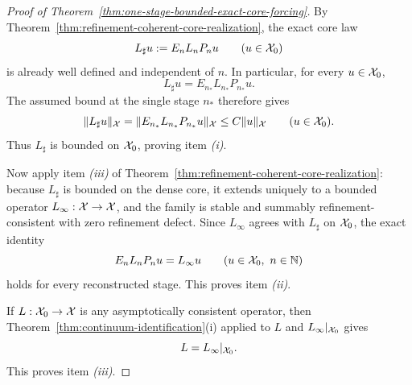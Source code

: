 \begin{proof}[Proof of Theorem~\ref{thm:one-stage-bounded-exact-core-forcing}]
\label{proof:thm:one-stage-bounded-exact-core-forcing}
By Theorem~\ref{thm:refinement-coherent-core-realization}, the exact core law
\[
L_\sharp u:=E_nL_nP_nu
\qquad (u\in\mathcal{X}_0)
\]
is already well defined and independent of \(n\). In particular, for every
\(u\in\mathcal{X}_0\),
\[
L_\sharp u
=
E_{n_\ast}L_{n_\ast}P_{n_\ast}u.
\]
The assumed bound at the single stage \(n_\ast\) therefore gives
\[
\|L_\sharp u\|_{\mathcal{X}}
=
\|E_{n_\ast}L_{n_\ast}P_{n_\ast}u\|_{\mathcal{X}}
\le
C\|u\|_{\mathcal{X}}
\qquad (u\in\mathcal{X}_0).
\]
Thus \(L_\sharp\) is bounded on \(\mathcal{X}_0\), proving item \emph{(i)}.

Now apply item \emph{(iii)} of
Theorem~\ref{thm:refinement-coherent-core-realization}: because \(L_\sharp\) is
bounded on the dense core, it extends uniquely to a bounded operator
\(L_\infty:\mathcal{X}\to\mathcal{X}\), and the family is stable and summably
refinement-consistent with zero refinement defect. Since \(L_\infty\) agrees
with \(L_\sharp\) on \(\mathcal{X}_0\), the exact identity
\[
E_nL_nP_nu=L_\infty u
\qquad (u\in\mathcal{X}_0,\ n\in\mathbb{N})
\]
holds for every reconstructed stage. This proves item \emph{(ii)}.

If \(L:\mathcal{X}_0\to\mathcal{X}\) is any asymptotically consistent operator, then
Theorem~\ref{thm:continuum-identification}(i) applied to \(L\) and
\(L_\infty|_{\mathcal{X}_0}\) gives
\[
L=L_\infty|_{\mathcal{X}_0}.
\]
This proves item \emph{(iii)}.
\end{proof}

